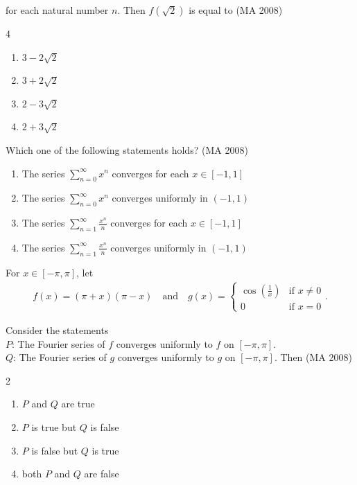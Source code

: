 for each natural number $n$. Then $f(\sqrt{2})$ is equal to
\hfill (MA 2008)
\begin{multicols}{4}
\begin{enumerate}
    \item $3 - 2\sqrt{2}$
    \item $3 + 2\sqrt{2}$
    \item $2 - 3\sqrt{2}$
    \item $2 + 3\sqrt{2}$
\end{enumerate}
\end{multicols}


\item
Which one of the following statements holds?
\hfill (MA 2008)
\begin{enumerate}
    \item The series $\sum_{n=0}^{\infty} x^n$ converges for each $x \in [-1,1]$
    \item The series $\sum_{n=0}^{\infty} x^n$ converges uniformly in $(-1,1)$
    \item The series $\sum_{n=1}^{\infty} \frac{x^n}{n}$ converges for each $x \in [-1,1]$
    \item The series $\sum_{n=1}^{\infty} \frac{x^n}{n}$ converges uniformly in $(-1,1)$
\end{enumerate}

\item
For $x \in [-\pi, \pi]$, let
\begin{align}
    f(x) = (\pi + x)(\pi - x) \quad \text{and} \quad 
g(x) = 
\begin{cases}
\cos\left(\frac{1}{x}\right) & \text{if } x \neq 0 \\
0 & \text{if } x = 0
\end{cases}.
\end{align}

Consider the statements\\
$P$: The Fourier series of $f$ converges uniformly to $f$ on $[-\pi, \pi]$.\\
$Q$: The Fourier series of $g$ converges uniformly to $g$ on $[-\pi, \pi]$. Then
\hfill (MA 2008)
\begin{multicols}{2}
\begin{enumerate}
    \item $P$ and $Q$ are true
    \item $P$ is true but $Q$ is false
    \item $P$ is false but $Q$ is true
    \item both $P$ and $Q$ are false
\end{enumerate}
\end{multicols}


